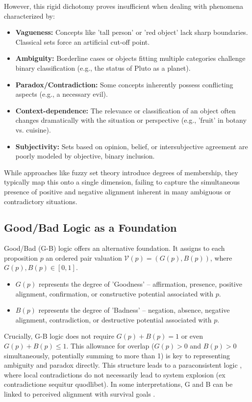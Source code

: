 \documentclass[11pt]{article}
\newcommand{\gbval}[1]{\mathcal{V}(#1)}         %
\newcommand{\gcomp}[1]{G(#1)}                   %
\newcommand{\bcomp}[1]{B(#1)}                   %
\theoremstyle{definition}
\theoremstyle{plain}
\begin{document}
However, this rigid dichotomy proves insufficient when dealing with phenomena characterized by:
\begin{itemize}
    \item \textbf{Vagueness:} Concepts like 'tall person' or 'red object' lack sharp boundaries. Classical sets force an artificial cut-off point.
    \item \textbf{Ambiguity:} Borderline cases or objects fitting multiple categories challenge binary classification (e.g., the status of Pluto as a planet).
    \item \textbf{Paradox/Contradiction:} Some concepts inherently possess conflicting aspects (e.g., a necessary evil).
    \item \textbf{Context-dependence:} The relevance or classification of an object often changes dramatically with the situation or perspective (e.g., 'fruit' in botany vs. cuisine).
    \item \textbf{Subjectivity:} Sets based on opinion, belief, or intersubjective agreement are poorly modeled by objective, binary inclusion.
\end{itemize}
While approaches like fuzzy set theory \cite{zadeh_fuzzy} introduce degrees of membership, they typically map this onto a single dimension, failing to capture the simultaneous presence of positive and negative alignment inherent in many ambiguous or contradictory situations.

\subsection{Good/Bad Logic as a Foundation}
Good/Bad (G-B) logic \cite{gb_logic_paper} offers an alternative foundation. It assigns to each proposition $p$ an ordered pair valuation $\gbval{p} = (\gcomp{p}, \bcomp{p})$, where $\gcomp{p}, \bcomp{p} \in [0, 1]$.
\begin{itemize}
    \item $\gcomp{p}$ represents the degree of 'Goodness' – affirmation, presence, positive alignment, confirmation, or constructive potential associated with $p$.
    \item $\bcomp{p}$ represents the degree of 'Badness' – negation, absence, negative alignment, contradiction, or destructive potential associated with $p$.
\end{itemize}
Crucially, G-B logic does not require $\gcomp{p} + \bcomp{p} = 1$ or even $\gcomp{p} + \bcomp{p} \le 1$. This allowance for overlap ($\gcomp{p} > 0$ and $\bcomp{p} > 0$ simultaneously, potentially summing to more than 1) is key to representing ambiguity and paradox directly. This structure leads to a paraconsistent logic \cite{priest_paraconsistent}, where local contradictions do not necessarily lead to system explosion (ex contradictione sequitur quodlibet). In some interpretations, G and B can be linked to perceived alignment with survival goals \cite{gb_logic_paper, eor_philosophy}.
\end{document}
